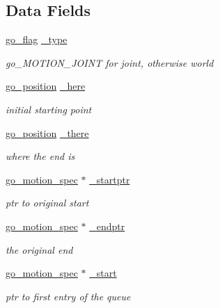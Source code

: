 \subsection*{Data Fields}
\begin{DoxyCompactItemize}
\item 
\hyperlink{gotypes_8h_ae890d9a0ddecc0d3073622cc4312092d}{go\-\_\-flag} \hyperlink{structgomotion_1_1go__motion__queue_a0c5400b47c8a5e5966da98832ddad2dd}{\-\_\-type}
\begin{DoxyCompactList}\small\item\em go\-\_\-\-M\-O\-T\-I\-O\-N\-\_\-\-J\-O\-I\-N\-T for joint, otherwise world \end{DoxyCompactList}\item 
\hyperlink{structgomotion_1_1go__position}{go\-\_\-position} \hyperlink{structgomotion_1_1go__motion__queue_a9df9c96ad6bbcbb60c0c58754790d83b}{\-\_\-here}
\begin{DoxyCompactList}\small\item\em initial starting point \end{DoxyCompactList}\item 
\hyperlink{structgomotion_1_1go__position}{go\-\_\-position} \hyperlink{structgomotion_1_1go__motion__queue_a96ac4977f0e8c0a01930f945262015fa}{\-\_\-there}
\begin{DoxyCompactList}\small\item\em where the end is \end{DoxyCompactList}\item 
\hyperlink{structgomotion_1_1go__motion__spec}{go\-\_\-motion\-\_\-spec} $\ast$ \hyperlink{structgomotion_1_1go__motion__queue_a0115449f0ee391d3e1d473e5861d594e}{\-\_\-startptr}
\begin{DoxyCompactList}\small\item\em ptr to original start \end{DoxyCompactList}\item 
\hyperlink{structgomotion_1_1go__motion__spec}{go\-\_\-motion\-\_\-spec} $\ast$ \hyperlink{structgomotion_1_1go__motion__queue_a56b0eb35d9ff084d1a1f555dae780ad9}{\-\_\-endptr}
\begin{DoxyCompactList}\small\item\em the original end \end{DoxyCompactList}\item 
\hyperlink{structgomotion_1_1go__motion__spec}{go\-\_\-motion\-\_\-spec} $\ast$ \hyperlink{structgomotion_1_1go__motion__queue_aa48dfdfd799a6cf63856b760d264c23b}{\-\_\-start}
\begin{DoxyCompactList}\small\item\em ptr to first entry of the queue \end{DoxyCompactList}\item 

\end{DoxyCompactItemize}
